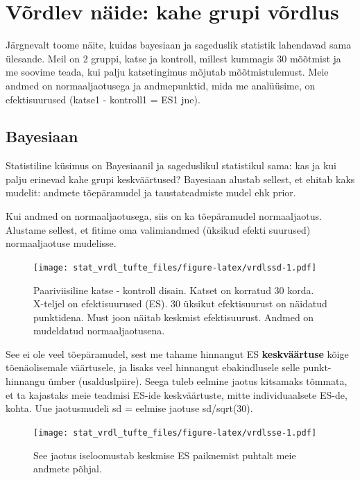 \documentclass[]{book}
\begin{document}
\section*{Võrdlev näide: kahe grupi
võrdlus}\label{vordlev-naide-kahe-grupi-vordlus-1}

Järgnevalt toome näite, kuidas bayesiaan ja sageduslik statistik
lahendavad sama ülesande. Meil on 2 gruppi, katse ja kontroll, millest
kummagis 30 mõõtmist ja me soovime teada, kui palju katsetingimus
mõjutab mõõtmistulemust. Meie andmed on normaaljaotusega ja
andmepunktid, mida me analüüsime, on efektisuurused (katse1 - kontroll1
= ES1 jne).

\subsection*{Bayesiaan}\label{bayesiaan-1}

Statistiline küsimus on Bayesiaanil ja sageduslikul statistikul sama:
kas ja kui palju erinevad kahe grupi keskväärtused? Bayesiaan alustab
sellest, et ehitab kaks mudelit: andmete tõepäramudel ja taustateadmiste
mudel ehk prior.

Kui andmed on normaaljaotusega, siis on ka tõepäramudel normaaljaotus.
Alustame sellest, et fitime oma valimiandmed (üksikud efekti suurused)
normaaljaotuse mudelisse.

\begin{figure}
\centering
\texttt{[image: stat\_vrdl\_tufte\_files/figure-latex/vrdlssd-1.pdf]}
\caption{\label{fig:vrdlssd}Paariviisiline katse - kontroll disain. Katset
on korratud 30 korda. X-teljel on efektisuurused (ES). 30 üksikut
efektisuurust on näidatud punktidena. Must joon näitab keskmist
efektisuurust. Andmed on mudeldatud normaaljaotusena.}
\end{figure}

See ei ole veel tõepäramudel, sest me tahame hinnangut ES
\textbf{keskväärtuse} kõige tõenäolisemale väärtusele, ja lisaks veel
hinnangut ebakindlusele selle punkt-hinnangu ümber (usalduslpiire).
Seega tuleb eelmine jaotus kitsamaks tõmmata, et ta kajastaks meie
teadmisi ES-ide keskväärtuste, mitte individuaalsete ES-de, kohta. Uue
jaotusmudeli sd = eelmise jaotuse sd/sqrt(30).

\begin{figure}
\centering
\texttt{[image: stat\_vrdl\_tufte\_files/figure-latex/vrdlsse-1.pdf]}
\caption{\label{fig:vrdlsse}See jaotus iseloomustab keskmise ES paiknemist
puhtalt meie andmete põhjal.}
\end{figure}
\end{document}
